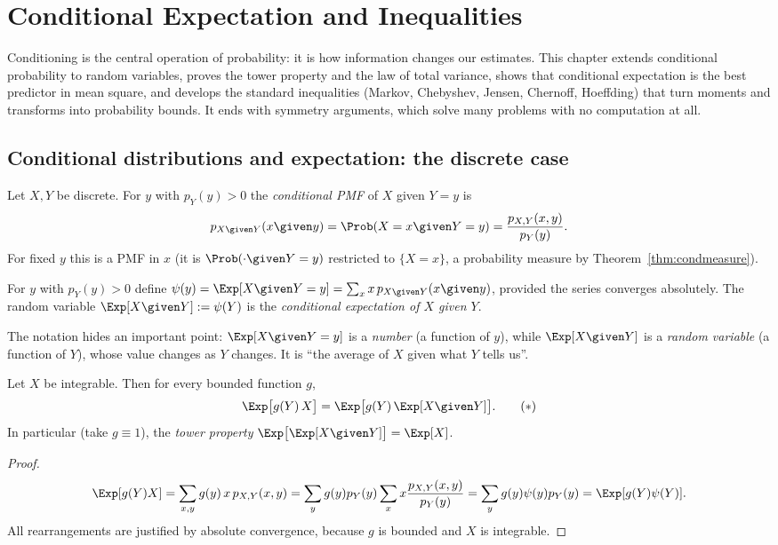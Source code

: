 \chapter{Conditional Expectation and Inequalities}
\label{ch:condexp}

Conditioning is the central operation of probability: it is how information
changes our estimates. This chapter extends conditional probability to random
variables, proves the tower property and the law of total variance, shows that
conditional expectation is the best predictor in mean square, and develops the
standard inequalities (Markov, Chebyshev, Jensen, Chernoff, Hoeffding) that turn
moments and transforms into probability bounds. It ends with symmetry arguments,
which solve many problems with no computation at all.

\section{Conditional distributions and expectation: the discrete case}

Let $X,Y$ be discrete. For $y$ with $p_Y(y)>0$ the \emph{conditional PMF} of $X$
given $Y=y$ is
\[
p_{X\given Y}(x\given y)=\Prob(X=x\given Y=y)=\frac{p_{X,Y}(x,y)}{p_Y(y)} .
\]
For fixed $y$ this is a PMF in $x$ (it is $\Prob(\cdot\given Y=y)$ restricted to
$\{X=x\}$, a probability measure by Theorem~\ref{thm:condmeasure}).

\begin{definition}
For $y$ with $p_Y(y)>0$ define
$\psi(y)=\Exp[X\given Y=y]=\sum_xx\,p_{X\given Y}(x\given y)$, provided the series
converges absolutely. The random variable $\Exp[X\given Y]:=\psi(Y)$ is the
\emph{conditional expectation of $X$ given $Y$}.
\end{definition}

The notation hides an important point: $\Exp[X\given Y=y]$ is a \emph{number} (a
function of $y$), while $\Exp[X\given Y]$ is a \emph{random variable} (a function
of $Y$), whose value changes as $Y$ changes. It is ``the average of $X$ given what
$Y$ tells us''.

\begin{theorem}\label{thm:tower}
Let $X$ be integrable. Then for every bounded function $g$,
\[
\Exp\bigl[g(Y)\,X\bigr]=\Exp\bigl[g(Y)\,\Exp[X\given Y]\bigr].
\tag{$\ast$}
\]
In particular (take $g\equiv1$), the \emph{tower property}
$\Exp\bigl[\Exp[X\given Y]\bigr]=\Exp[X]$.
\end{theorem}
\begin{proof}
\[
\Exp[g(Y)X]=\sum_{x,y}g(y)\,x\,p_{X,Y}(x,y)=\sum_yg(y)p_Y(y)\sum_xx\frac{p_{X,Y}(x,y)}{p_Y(y)}
=\sum_yg(y)\psi(y)p_Y(y)=\Exp[g(Y)\psi(Y)].
\]
All rearrangements are justified by absolute convergence, because $g$ is bounded
and $X$ is integrable.
\end{proof}

